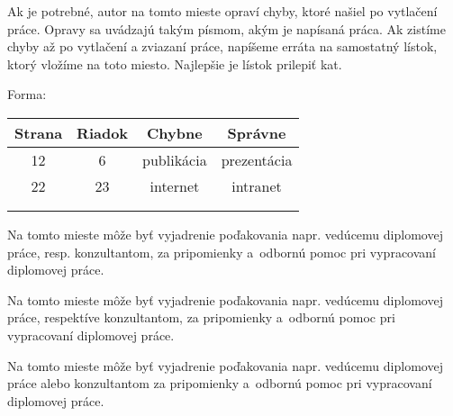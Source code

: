 \documentclass[a4paper,helvetica]{tukediphc}
\begin{document}
\renewcommand\theHfigure{\theHsection.\arabic{figure}}
\renewcommand\theHtable{\theHsection.\arabic{table}}


\prvastrana

\titulnastrana


\errata %
Ak je potrebné, autor na tomto mieste opraví chyby, ktoré našiel po
vytlačení práce. Opravy sa uvádzajú takým písmom, akým je napísaná
práca. Ak zistíme chyby až po vytlačení a zviazaní práce, napíšeme
erráta na samostatný lístok, ktorý vložíme na toto miesto. Najlepšie je
lístok prilepiť\/ kat.

Forma:

\tabcolsep=10pt
\begin{table}[!hb]
	\centering
	\begin{tabular}{|c|c|c|c|}\hline
Strana & Riadok & Chybne & Správne \\\hline\hline
12 & 6 & publikácia & prezentácia \\\hline
22 & 23 & internet & intranet \\\hline
& & & \\\hline
& & & \\\hline
	\end{tabular}
\end{table}
\kerrata %

\abstraktsk %

\abstrakteng %

\kabstrakt %

\zadanieprace

\cestnevyhlasenie

\podakovanie
Na tomto mieste môže byť\/ vyjadrenie poďakovania napr. vedúcemu
diplomovej práce, resp. konzultantom, za pripomienky a~odbornú pomoc
pri vypracovaní diplomovej práce.

Na tomto mieste môže byť\/ vyjadrenie poďakovania napr. vedúcemu
diplomovej práce, respektíve konzultantom, za pripomienky a~odbornú
pomoc pri vypracovaní diplomovej práce.

Na tomto mieste môže byť\/ vyjadrenie poďakovania napr. vedúcemu
diplomovej práce alebo konzultantom za pripomienky a~odbornú pomoc pri
vypracovaní diplomovej práce.
\kpodakovania
\end{document}
